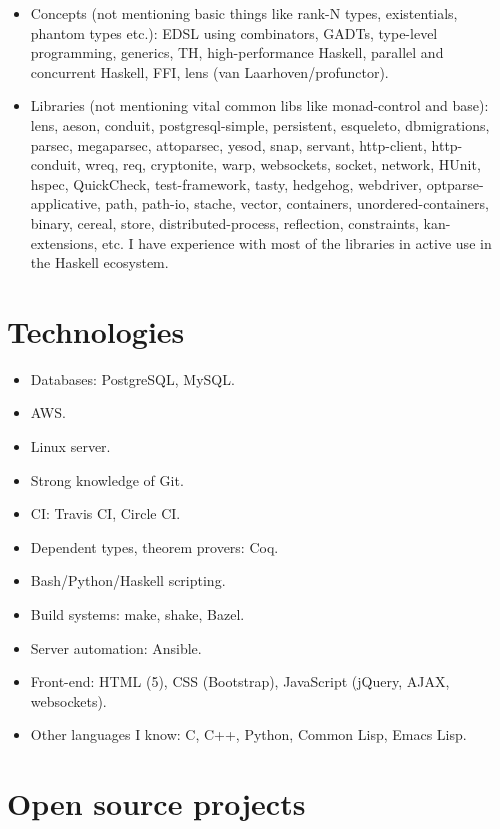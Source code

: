\documentclass[a4paper,12pt]{article}
\begin{document}
\begin{itemize}[noitemsep]
\item Concepts (not mentioning basic things like rank-N types, existentials,
  phantom types etc.): EDSL using combinators, GADTs, type-level
  programming, generics, TH, high-performance Haskell, parallel and
  concurrent Haskell, FFI, lens (van Laarhoven/profunctor).
\item Libraries (not mentioning vital common libs like monad-control and
  base): lens, aeson, conduit, postgresql-simple, persistent, esqueleto,
  dbmigrations, parsec, megaparsec, attoparsec, yesod, snap, servant,
  http-client, http-conduit, wreq, req, cryptonite, warp, websockets,
  socket, network, HUnit, hspec, QuickCheck, test-framework, tasty,
  hedgehog, webdriver, optparse-applicative, path, path-io, stache, vector,
  containers, unordered-containers, binary, cereal, store,
  distributed-process, reflection, constraints, kan-extensions, etc. I have
  experience with most of the libraries in active use in the Haskell
  ecosystem.
\end{itemize}

\pagebreak

\section*{Technologies}

\begin{itemize}[noitemsep]
\item Databases: PostgreSQL, MySQL.
\item AWS.
\item Linux server.
\item Strong knowledge of Git.
\item CI: Travis CI, Circle CI.
\item Dependent types, theorem provers: Coq.
\item Bash/Python/Haskell scripting.
\item Build systems: make, shake, Bazel.
\item Server automation: Ansible.
\item Front-end: HTML (5), CSS (Bootstrap), JavaScript (jQuery, AJAX,
  websockets).
\item Other languages I know: C, C++, Python, Common Lisp, Emacs Lisp.
\end{itemize}

\section*{Open source projects}
\end{document}
